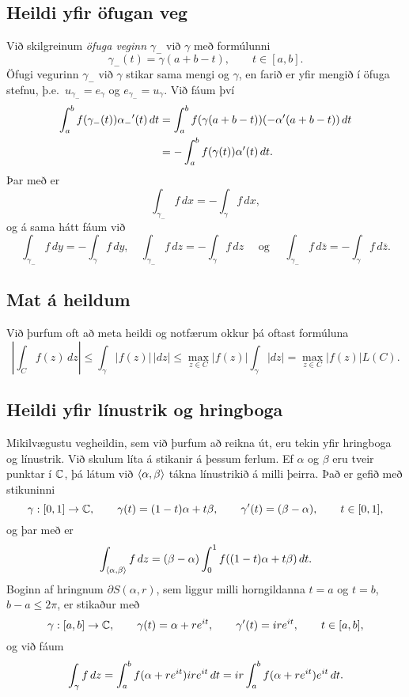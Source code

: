 \subsection*{Heildi yfir öfugan veg}

Við
skilgreinum {\it öfuga veginn}
$\gamma_-$ við $\gamma$ með formúlunni 
 $$\gamma_-(t)=\gamma(a+b-t), \qquad t\in [a,b].
 $$
Öfugi vegurinn ${\gamma}_-$ við ${\gamma}$ stikar sama mengi og
${\gamma}$, en farið er yfir mengið í öfuga stefnu,
þ.e.~$u_{\gamma_-}=e_{\gamma}$ og $e_{\gamma_-}=u_{\gamma}$.
Við fáum því     
\begin{align*}
\int_a\sp b f(\gamma_-(t))\alpha_-{\sp{\prime}}(t) \, dt &=
\int_a\sp b f(\gamma(a+b-t))(-\alpha{\sp{\prime}}(a+b-t)) \, dt \\
&=
-\int_a\sp b f(\gamma(t))\alpha{\sp{\prime}}(t) \, dt.
\end{align*}
Þar með er
 $$\int_{\gamma_-}f\, dx = -\int_\gamma f\, dx,
 $$
og á sama hátt fáum við 
 $$
\int_{\gamma_-}f\, dy = -\int_\gamma f\, dy, \quad 
\int_{\gamma_-}f\, dz = -\int_\gamma f\, dz \quad \text{ og } \quad
\int_{\gamma_-}f\, d\bar z = -\int_\gamma f\, d\bar z.
 $$


\subsection*{Mat á heildum}

Við þurfum oft  að meta heildi og notfærum okkur þá
oftast formúluna
 $$
| \int_C f(z)\, dz| \leq \int_\gamma |f(z)|\, |dz|\leq \max_{z\in C}
|f(z)| \int_\gamma |dz|= \max_{z\in C}|f(z)|L(C).
 $$


\subsection*{Heildi yfir línustrik og hringboga }

Mikilvægustu vegheildin, sem við þurfum að reikna út, eru tekin yfir
hringboga og línustrik.  Við skulum
líta á stikanir á þessum ferlum.  Ef $\alpha$ og $\beta$ eru tveir punktar í
${\mathbb C}$, þá látum við ${\langle\alpha,\beta\rangle}$ tákna línustrikið á milli
þeirra.  Það er gefið með stikuninni
 $$
\gamma:[0,1]\to {\mathbb C}, \qquad \gamma(t)=(1-t)\alpha+t\beta, \qquad
\gamma{\sp{\prime}}(t)= (\beta-\alpha), \qquad t\in [0,1],
 $$
og þar með er 
 $$\int_{{\langle\alpha,\beta\rangle}} f \, dz = (\beta-\alpha)\int_0\sp 1
f((1-t)\alpha+t\beta)\, dt.
 $$
Boginn af hringnum $\partial S(\alpha,r)$, sem liggur milli
horngildanna $t=a$ og $t=b$, $b-a\leq 2{\pi}$, er stikaður með
 $$\gamma:[a,b]\to {\mathbb C}, \qquad
\gamma(t)= \alpha+re\sp{it}, \qquad
\gamma{\sp{\prime}}(t)= ire\sp{it}, \qquad t\in [a,b],
 $$
og við fáum 
 $$
\int_\gamma f \, dz = \int_a\sp b f(\alpha+re\sp{it})ire\sp{it}\, dt
= ir \int_a\sp b f(\alpha+re\sp{it})e\sp{it}\, dt.
 $$


